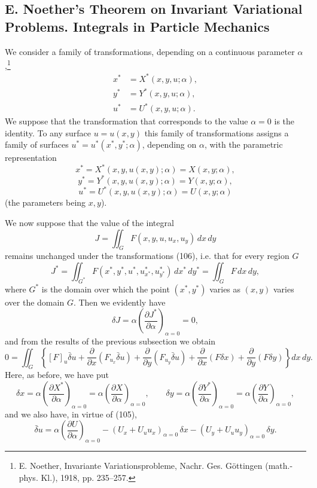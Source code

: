 \subsection{E. Noether's Theorem on Invariant Variational Problems. Integrals in Particle Mechanics}
We consider a family of transformations, depending on a continuous parameter $\alpha$,\footnote{E. Noether, Invariante Variationsprobleme, Nachr. Ges. G\"ottingen (math.-phys. Kl.), 1918, pp. 235--257.}
\begin{equation}\tag{106}
\begin{aligned}
x^*&=X^*(x,y,u;\alpha),\\
y^*&=Y^*(x,y,u;\alpha),\\
u^*&=U^*(x,y,u;\alpha).
\end{aligned}
\end{equation}
We suppose that the transformation that corresponds to the value $\alpha=0$ is the identity. To any surface $u=u(x,y)$ this family of transformations assigns a family of surfaces $u^*=u^*(x^*,y^*;\alpha)$, depending on $\alpha$, with the parametric representation
\[
x^*=X^*(x,y,u(x,y);\alpha)=X(x,y;\alpha),
\]
\[
y^*=Y^*(x,y,u(x,y);\alpha)=Y(x,y;\alpha),
\]
\[
u^*=U^*(x,y,u(x,y);\alpha)=U(x,y;\alpha)
\]
(the parameters being $x,y$).

We now suppose that the value of the integral
\[
J=\iint_G F(x,y,u,u_x,u_y)\,dx\,dy
\]
remains unchanged under the transformations (106), i.e. that for every region $G$
\[
J^*=\iint_{G^*}F(x^*,y^*,u^*,u^*_{x^*},u^*_{y^*})\,dx^*\,dy^*=\iint_G F\,dx\,dy,
\]
where $G^*$ is the domain over which the point $(x^*,y^*)$ varies as $(x,y)$ varies over the domain $G$. Then we evidently have
\[
\delta J=\alpha\left(\frac{\partial J^*}{\partial\alpha}\right)_{\alpha=0}=0,
\]
and from the results of the previous subsection we obtain
\begin{equation}\tag{107}
0=\iint_G\left\{[F]_u\bar\delta u
+\frac{\partial}{\partial x}(F_{u_x}\bar\delta u)
+\frac{\partial}{\partial y}(F_{u_y}\bar\delta u)
+\frac{\partial}{\partial x}(F\delta x)
+\frac{\partial}{\partial y}(F\delta y)\right\}dx\,dy.
\end{equation}
Here, as before, we have put
\begin{equation}\tag{108}
\delta x=\alpha\left(\frac{\partial X^*}{\partial\alpha}\right)_{\alpha=0}
=\alpha\left(\frac{\partial X}{\partial\alpha}\right)_{\alpha=0},\qquad
\delta y=\alpha\left(\frac{\partial Y^*}{\partial\alpha}\right)_{\alpha=0}
=\alpha\left(\frac{\partial Y}{\partial\alpha}\right)_{\alpha=0},
\end{equation}
and we also have, in virtue of (105),
\begin{equation}\tag{109}
\bar\delta u=\alpha\left(\frac{\partial U}{\partial\alpha}\right)_{\alpha=0}
-(U_x+U_uu_x)_{\alpha=0}\,\delta x
-(U_y+U_uu_y)_{\alpha=0}\,\delta y.
\end{equation}

